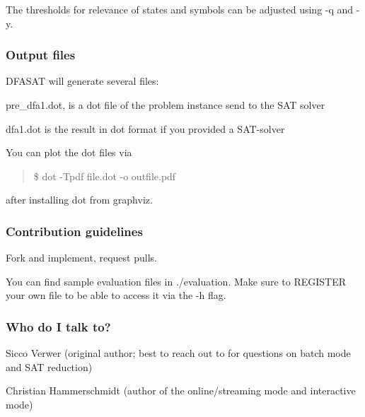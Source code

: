 The thresholds for relevance of states and symbols can be adjusted using -\/q and -\/y.

\subsubsection*{Output files}

D\+F\+A\+S\+AT will generate several files\+:


\begin{DoxyItemize}
\item pre\+\_\+dfa1.\+dot, is a dot file of the problem instance send to the S\+AT solver
\item dfa1.\+dot is the result in dot format if you provided a S\+A\+T-\/solver
\end{DoxyItemize}

You can plot the dot files via

\begin{quote}
\$ dot -\/\+Tpdf file.\+dot -\/o outfile.\+pdf \end{quote}


after installing dot from graphviz.

\subsubsection*{Contribution guidelines}


\begin{DoxyItemize}
\item Fork and implement, request pulls.
\item You can find sample evaluation files in ./evaluation. Make sure to R\+E\+G\+I\+S\+T\+ER your own file to be able to access it via the -\/h flag.
\end{DoxyItemize}

\subsubsection*{Who do I talk to?}


\begin{DoxyItemize}
\item Sicco Verwer (original author; best to reach out to for questions on batch mode and S\+AT reduction)
\item Christian Hammerschmidt (author of the online/streaming mode and interactive mode) 
\end{DoxyItemize}